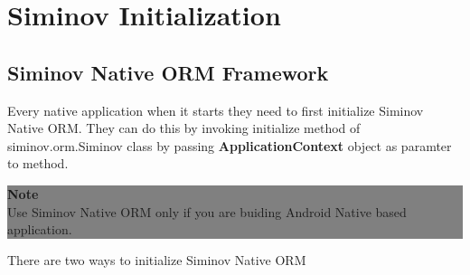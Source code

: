 \newpage
\chapter {\Large{Siminov Initialization}}

\section{Siminov Native ORM Framework}
Every native application when it starts they need to first initialize Siminov Native ORM. They can do this by invoking initialize method of siminov.orm.Siminov class by passing \textbf{ApplicationContext} object as paramter to method.

		\begin{center}
			\colorbox{grey}{
				\parbox[t]{.8\linewidth}{
					\fontsize{11pt}{11pt}\selectfont %
					\vspace*{0.1cm} %
		
					\hfill \textbf{Note} \\

					Use Siminov Native ORM only if you are buiding Android Native based application. 

					\vspace*{0.0cm} %
				}
			}

		\end{center}



\par
There are two ways to initialize Siminov Native ORM

